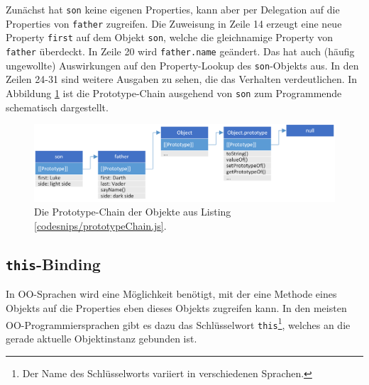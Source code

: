 Zunächst hat \texttt{son} keine eigenen Properties, kann aber per Delegation auf die Properties von \texttt{father} zugreifen. Die Zuweisung in Zeile 14 erzeugt eine neue Property \texttt{first} auf dem Objekt \texttt{son}, welche die gleichnamige Property von \texttt{father} überdeckt. In Zeile 20 wird \texttt{father.name} geändert. Das hat auch (häufig ungewollte) Auswirkungen auf den Property-Lookup des \texttt{son}-Objekts aus. In den Zeilen 24-31 sind weitere Ausgaben zu sehen, die das Verhalten verdeutlichen. In Abbildung \ref{prototypeChain} ist die Prototype-Chain ausgehend von \texttt{son} zum Programmende schematisch dargestellt.

\begin{figure}[h]
	\centering
	\includegraphics[width=1\textwidth]{images/prototypeChain.png}
	\caption{\label{prototypeChain}Die Prototype-Chain der Objekte aus Listing \ref{codesnips/prototypeChain.js}.}
\end{figure}





\subsection{\texttt{this}-Binding}


In OO-Sprachen wird eine Möglichkeit benötigt, mit der eine Methode eines Objekts auf die Properties eben dieses Objekts zugreifen kann. In den meisten OO-Pro\-gram\-mier\-spra\-chen gibt es dazu das Schlüsselwort \texttt{this}\footnote{
Der Name des Schlüsselworts variiert in verschiedenen Sprachen.
}, welches an die gerade aktuelle Objektinstanz gebunden ist. 

